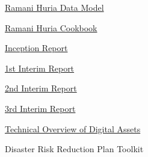 \documentclass[a4paper,12pt,twoside]{article}
\begin{document}
\href{https://wiki.openstreetmap.org/wiki/Dar_es_Salaam/Ramani_Huria}{Ramani Huria Data Model}

\href{https://drive.google.com/file/d/1M0jcJHxdIDlrCRr09c4G8ZVlvl43j_1b/view}{Ramani Huria Cookbook}

\href{https://docs.google.com/document/d/1PwHRtdRvOfeEhpsIl-gpQXTTDoVwW_0--wRsmeUhVt4/edit#}{Inception Report}

\href{https://docs.google.com/document/d/1oW4y4ZT76viHu_sDnrBYrFsJfu_a0CAn9GLIxmG_rpc/edit}{1st Interim Report}

\href{https://docs.google.com/document/d/1Zn35NGLn2n-X93Z2hwiWwQwUnMljCoD7hwTUrTEXxTg/edit}{2nd Interim Report}

\href{https://docs.google.com/document/d/1D03BG5Pkmo0XMIyrvvgVLqdeyfkmwxRRs3UQdekNspk/edit}{3rd Interim Report}

\href{https://docs.google.com/document/d/1Cc-ztcmc53LqlqhAXC1neCyxuRJujN16nhcibMg04qw/edit}{Technical Overview of Digital Assets}

Disaster Risk Reduction Plan Toolkit

\newpage
\thispagestyle{empty}
\clearpage
\end{document}
